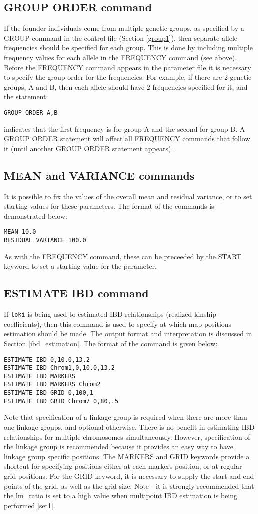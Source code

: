 \documentclass[10pt,a4paper]{article}
\newcommand{\Loki}{\texttt{loki}\xspace}
\begin{document}
\subsection{GROUP ORDER command}\label{group2}
If the founder individuals come from multiple genetic groups, as specified
by a GROUP command in the control file (Section \ref{group1}), then separate
allele frequencies should be specified for each group.  This is done by
including multiple frequency values for each allele in the FREQUENCY command
(see above). Before the FREQUENCY command appears in the parameter file it
is necessary to specify the group order for the frequencies.  For example,
if there are 2 genetic groups, A and B, then each allele should have 2
frequencies specified for it, and the statement:
\begin{verbatim}
GROUP ORDER A,B
\end{verbatim}
indicates that the first frequency is for group A and the second for group
B.  A GROUP ORDER statement will affect all FREQUENCY commands that follow
it (until another GROUP ORDER statement appears).
\subsection{MEAN and VARIANCE commands}
It is possible to fix the values of the overall mean and residual variance, or
to set starting values for these parameters.  The format of the commands is
demonstrated below:
\begin{verbatim}
MEAN 10.0
RESIDUAL VARIANCE 100.0
\end{verbatim}
As with the FREQUENCY command, these can be preceeded by the START keyword
to set a starting value for the parameter.
\subsection{ESTIMATE IBD command}\label{estibd}
If \Loki is being used to estimated IBD relationships (realized kinship
coefficients), then this command is used to specify at which map positions
estimation should be made.  The output format and interpretation is
discussed in Section \ref{ibd_estimation}. The format of the command is
given below:
\begin{verbatim}
ESTIMATE IBD 0,10.0,13.2
ESTIMATE IBD Chrom1,0,10.0,13.2
ESTIMATE IBD MARKERS
ESTIMATE IBD MARKERS Chrom2
ESTIMATE IBD GRID 0,100,1
ESTIMATE IBD GRID Chrom7 0,80,.5
\end{verbatim}
Note that specification of a linkage group is required when there are more
than one linkage groups, and optional otherwise.  There is no benefit in
estimating IBD relationships for multiple chromosomes simultaneously.
However, specification of the linkage group is recommended because it
provides an easy way to have linkage group specific positions.  The MARKERS
and GRID keywords provide a shortcut for specifying positions either at each
markers position, or at regular grid positions.  For the GRID keyword, it is
necessary to supply the start and end points of the grid, as well as the
grid size.  Note - it is strongly recommended that the lm\_ratio is set to a high
value when multipoint IBD estimation is being performed \ref{set1}.
\end{document}
